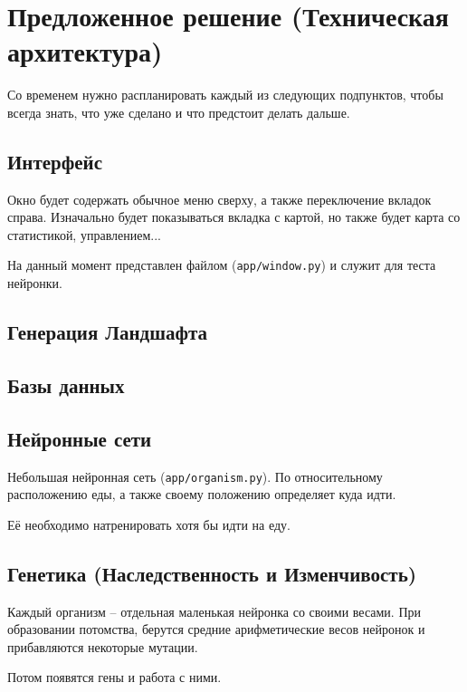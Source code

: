 \documentclass[12pt,a4paper, titlepage]{article}
\begin{document}
\section{Предложенное решение (Техническая архитектура)}
Со временем нужно распланировать каждый из следующих подпунктов, чтобы всегда знать, что уже сделано и что предстоит делать дальше.
\subsection{Интерфейс}
Окно будет содержать обычное меню сверху, а также переключение вкладок справа. Изначально будет показываться вкладка с картой, но также будет карта со статистикой, управлением...

На данный момент представлен файлом ({\tt app/window.py}) и служит для теста нейронки.
\subsection{Генерация Ландшафта}
\subsection{Базы данных}
\subsection{Нейронные сети}
Небольшая нейронная сеть ({\tt app/organism.py}). По относительному расположению еды, а также своему положению определяет куда идти.

Её необходимо натренировать хотя бы идти на еду.
\subsection{Генетика (Наследственность и Изменчивость)}
Каждый организм -- отдельная маленькая нейронка со своими весами.
При образовании потомства, берутся средние арифметические весов нейронок и прибавляются некоторые мутации.

Потом появятся гены и работа с ними.
\end{document}
